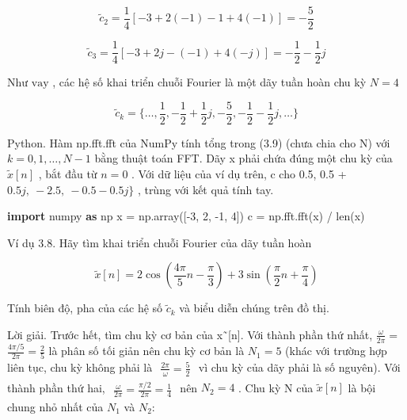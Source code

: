 \documentclass[
  10
]{article}
\newenvironment{Shaded}{}{}
\newcommand{\BuiltInTok}[1]{\textcolor[rgb]{0.00,0.50,0.00}{#1}}
\newcommand{\DecValTok}[1]{\textcolor[rgb]{0.25,0.63,0.44}{#1}}
\newcommand{\ImportTok}[1]{\textcolor[rgb]{0.00,0.50,0.00}{\textbf{#1}}}
\newcommand{\NormalTok}[1]{#1}
\newcommand{\OperatorTok}[1]{\textcolor[rgb]{0.40,0.40,0.40}{#1}}
\begin{document}
\[
\tilde {c} _ {2} = \frac {1}{4} [ - 3 + 2 (- 1) - 1 + 4 (- 1) ] = - \frac {5}{2}
\]

\[
\tilde {c} _ {3} = \frac {1}{4} [ - 3 + 2 j - (- 1) + 4 (- j) ] = - \frac {1}{2} - \frac {1}{2} j
\]

Như \(\mathrm { v a y }\) , các hệ số khai triển chuỗi Fourier là một
dãy tuần hoàn chu kỳ \(N = 4\)

\[
\tilde {c} _ {k} = \{\ldots , \frac {1}{2}, - \frac {1}{2} + \frac {1}{2} j, - \frac {5}{2}, - \frac {1}{2} - \frac {1}{2} j, \ldots \}
\]

Python. Hàm np.fft.fft của NumPy tính tổng trong (3.9) (chưa chia cho N)
với \(k = 0 , 1 , \ldots , N - 1\) bằng thuật toán FFT. Dãy x phải chứa
đúng một chu kỳ của \({ \tilde { x } } [ n ]\) , bắt đầu từ \(n = 0\) .
Với dữ liệu của ví dụ trên, c cho 0.5, 0.5 +
\(0 . 5 j , \ - 2 . 5 , \ - 0 . 5 - 0 . 5 j \}\) , trùng với kết quả
tính tay.

\begin{Shaded}
\begin{Highlighting}[]
\ImportTok{import}\NormalTok{ numpy }\ImportTok{as}\NormalTok{ np}
\NormalTok{x }\OperatorTok{=}\NormalTok{ np.array([}\OperatorTok{{-}}\DecValTok{3}\NormalTok{, }\DecValTok{2}\NormalTok{, }\OperatorTok{{-}}\DecValTok{1}\NormalTok{, }\DecValTok{4}\NormalTok{])}
\NormalTok{c }\OperatorTok{=}\NormalTok{ np.fft.fft(x) }\OperatorTok{/} \BuiltInTok{len}\NormalTok{(x) }
\end{Highlighting}
\end{Shaded}

Ví dụ 3.8. Hãy tìm khai triển chuỗi Fourier của dãy tuần hoàn

\[
\tilde {x} [ n ] = 2 \cos (\frac {4 \pi}{5} n - \frac {\pi}{3}) + 3 \sin (\frac {\pi}{2} n + \frac {\pi}{4})
\]

Tính biên độ, pha của các hệ số \(\tilde { c } _ { k }\) và biểu diễn
chúng trên đồ thị.

Lời giải. Trước hết, tìm chu kỳ cơ bản của x˜{[}n{]}. Với thành phần thứ
nhất, \(\textstyle { \frac { \omega } { 2 \pi } } =\)
\(\textstyle { \frac { 4 \pi / 5 } { 2 \pi } } = { \frac { 2 } { 5 } }\)
là phân số tối giản nên chu kỳ cơ bản là \(N _ { 1 } = 5\) (khác với
trường hợp liên tục, chu kỳ không phải là
\(\begin{array} { r } { \frac { 2 \pi } { \omega } = \frac { 5 } { 2 } } \end{array}\)
vì chu kỳ của dãy phải là số nguyên). Với thành phần thứ hai,
\(\begin{array} { r } { \frac { \omega } { 2 \pi } = \frac { \pi / 2 } { 2 \pi } = \frac { 1 } { 4 } } \end{array}\)
nên \(N _ { 2 } = 4\) . Chu kỳ N của \({ \tilde { x } } [ n ]\) là bội
chung nhỏ nhất của \(N _ { 1 }\) và \(N _ { 2 } { : }\)
\end{document}

